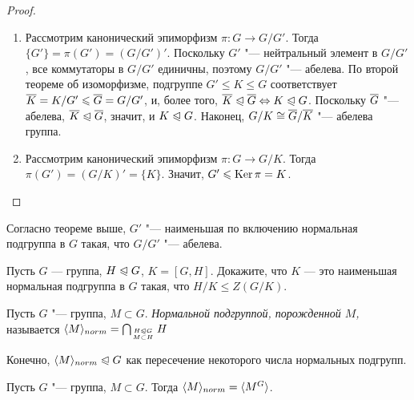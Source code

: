 \begin{proof}~
	\begin{enumerate}
		\item Рассмотрим канонический эпиморфизм $\pi: G \to G / G'$. Тогда $\{G'\} = \pi(G') = (G / G')'$. Поскольку $G'$ "--- нейтральный элемент в $G / G'$, все коммутаторы в $G / G'$ единичны, поэтому $G / G'$ "--- абелева. По второй теореме об изоморфизме, подгруппе $G' \le K \le G$ соответствует $\overline{K} = K / G' \leqslant \overline{G} = G / G'$, и, более того, $\overline{K} \trianglelefteqslant \overline{G} \Leftrightarrow K \trianglelefteqslant G$. Поскольку $\overline{G}$ "--- абелева, $\overline{K} \trianglelefteqslant \overline{G}$, значит, и $K \trianglelefteqslant G$. Наконец, $G / K \cong \overline{G} / \overline{K}$ "--- абелева группа.
		
		\item Рассмотрим канонический эпиморфизм $\pi: G \to G / K$. Тогда $\pi(G') = (G / K)' = \{K\}$. Значит, $G' \leqslant \operatorname{Ker}\pi = K$.
	\end{enumerate}
\end{proof}

\begin{note}
	Согласно теореме выше, $G'$ "--- наименьшая по включению нормальная подгруппа в $G$ такая, что $G / G'$ "--- абелева.
\end{note}

\begin{exercise}
	Пусть $G$ --- группа, $H \trianglelefteqslant G$, $K = [G, H]$. Докажите, что $K$ --- это наименьшая нормальная подгруппа в $G$ такая, что $H / K \le Z (G / K)$.
\end{exercise}

\begin{definition}
	Пусть $G$ "--- группа, $M \subset G$. \textit{Нормальной подгруппой, порожденной $M$,} называется $\langle M\rangle_{norm} = \bigcap_{H \trianglelefteqslant G \atop {M \subset H}} H$
\end{definition}

\begin{note}
	Конечно, $\langle M\rangle_{norm} \trianglelefteqslant G$ как пересечение некоторого числа нормальных подгрупп.
\end{note}

\begin{proposition}
	Пусть $G$ "--- группа, $M \subset G$. Тогда $\langle M\rangle_{norm} = \langle M^G\rangle$.
\end{proposition}

